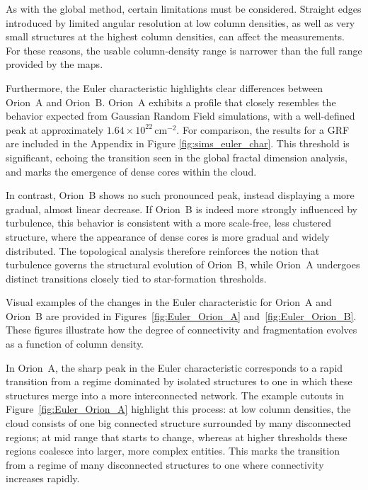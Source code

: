 As with the global method, certain limitations must be considered.  
Straight edges introduced by limited angular resolution at low column densities, as well as very small structures at the highest column densities, can affect the measurements.  
For these reasons, the usable column‑density range is narrower than the full range provided by the maps.

Furthermore, the Euler characteristic highlights clear differences between Orion~A and Orion~B.  
Orion~A exhibits a profile that closely resembles the behavior expected from Gaussian Random Field simulations, with a well-defined peak at approximately \(1.64 \times 10^{22}\,\mathrm{cm}^{-2}\). For comparison, the results for a GRF are included in the Appendix in Figure \ref{fig:sims_euler_char}. 
This threshold is significant, echoing the transition seen in the global fractal dimension analysis, and marks the emergence of dense cores within the cloud.

In contrast, Orion~B shows no such pronounced peak, instead displaying a more gradual, almost linear decrease.  
If Orion~B is indeed more strongly influenced by turbulence, this behavior is consistent with a more scale-free, less clustered structure, where the appearance of dense cores is more gradual and widely distributed.  
The topological analysis therefore reinforces the notion that turbulence governs the structural evolution of Orion~B, while Orion~A undergoes distinct transitions closely tied to star-formation thresholds.

Visual examples of the changes in the Euler characteristic for Orion~A and Orion~B are provided in Figures~\ref{fig:Euler_Orion_A} and~\ref{fig:Euler_Orion_B}.  
These figures illustrate how the degree of connectivity and fragmentation evolves as a function of column density.  

In Orion~A, the sharp peak in the Euler characteristic corresponds to a rapid transition from a regime dominated by isolated structures to one in which these structures merge into a more interconnected network.  
The example cutouts in Figure~\ref{fig:Euler_Orion_A} highlight this process: at low column densities, the cloud consists of one big connected structure surrounded by many disconnected regions; at mid range that starts to change, whereas at higher thresholds these regions coalesce into larger, more complex entities.
This marks the transition from a regime of many disconnected structures to one where connectivity increases rapidly.

